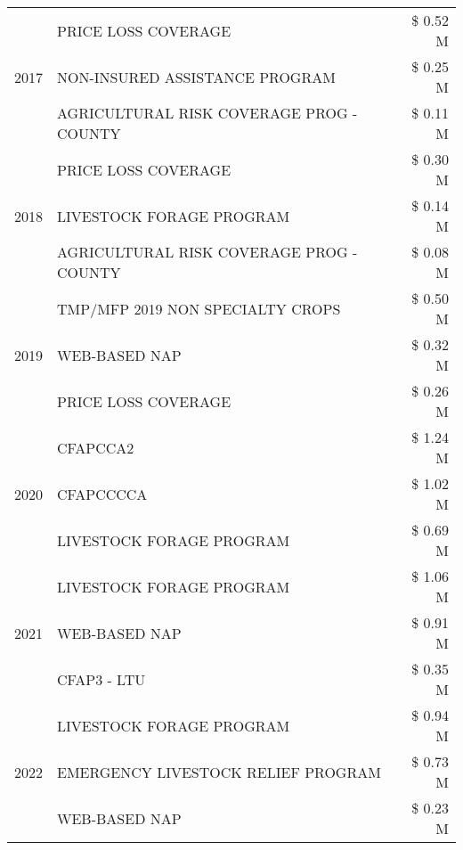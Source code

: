 \begin{tabular}{llr}
\cline{1-3}
\multirow[t]{3}{*}{2017} & PRICE LOSS COVERAGE & \$ 0.52 M \\
 & NON-INSURED ASSISTANCE PROGRAM & \$ 0.25 M \\
 & AGRICULTURAL RISK COVERAGE PROG - COUNTY & \$ 0.11 M \\
\cline{1-3}
\multirow[t]{3}{*}{2018} & PRICE LOSS COVERAGE & \$ 0.30 M \\
 & LIVESTOCK FORAGE PROGRAM & \$ 0.14 M \\
 & AGRICULTURAL RISK COVERAGE PROG - COUNTY & \$ 0.08 M \\
\cline{1-3}
\multirow[t]{3}{*}{2019} & TMP/MFP 2019 NON SPECIALTY CROPS & \$ 0.50 M \\
 & WEB-BASED NAP & \$ 0.32 M \\
 & PRICE LOSS COVERAGE & \$ 0.26 M \\
\cline{1-3}
\multirow[t]{3}{*}{2020} & CFAPCCA2 & \$ 1.24 M \\
 & CFAPCCCCA & \$ 1.02 M \\
 & LIVESTOCK FORAGE PROGRAM & \$ 0.69 M \\
\cline{1-3}
\multirow[t]{3}{*}{2021} & LIVESTOCK FORAGE PROGRAM & \$ 1.06 M \\
 & WEB-BASED NAP & \$ 0.91 M \\
 & CFAP3 - LTU & \$ 0.35 M \\
\cline{1-3}
\multirow[t]{3}{*}{2022} & LIVESTOCK FORAGE PROGRAM & \$ 0.94 M \\
 & EMERGENCY LIVESTOCK RELIEF PROGRAM & \$ 0.73 M \\
 & WEB-BASED NAP & \$ 0.23 M \\
\cline{1-3}
\bottomrule
\end{tabular}
